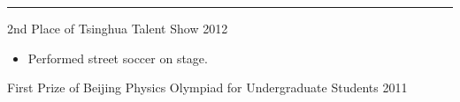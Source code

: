 \documentclass[10pt]{res} %
\begin{document}
\begin{resume}
\noindent\rule{\textwidth}{2pt}

\vspace{-5pt} %

\begin{center}
2nd Place of Tsinghua Talent Show \hfill 2012\\
\begin{itemize}
\item Performed street soccer on stage.
\end{itemize}
First Prize of Beijing Physics Olympiad for Undergraduate Students \hfill 2011
\end{center}


\end{resume} 
\end{document}
